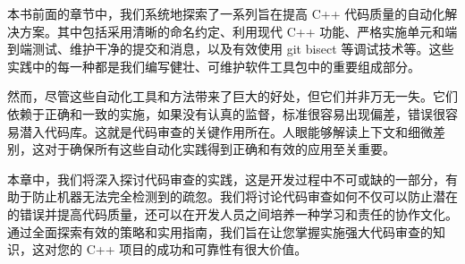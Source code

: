 本书前面的章节中，我们系统地探索了一系列旨在提高 C++ 代码质量的自动化解决方案。其中包括采用清晰的命名约定、利用现代 C++ 功能、严格实施单元和端到端测试、维护干净的提交和消息，以及有效使用 git bisect 等调试技术等。这些实践中的每一种都是我们编写健壮、可维护软件工具包中的重要组成部分。

然而，尽管这些自动化工具和方法带来了巨大的好处，但它们并非万无一失。它们依赖于正确和一致的实施，如果没有认真的监督，标准很容易出现偏差，错误很容易潜入代码库。这就是代码审查的关键作用所在。人眼能够解读上下文和细微差别，这对于确保所有这些自动化实践得到正确和有效的应用至关重要。

本章中，我们将深入探讨代码审查的实践，这是开发过程中不可或缺的一部分，有助于防止机器无法完全检测到的疏忽。我们将讨论代码审查如何不仅可以防止潜在的错误并提高代码质量，还可以在开发人员之间培养一种学习和责任的协作文化。通过全面探索有效的策略和实用指南，我们旨在让您掌握实施强大代码审查的知识，这对您的 C++ 项目的成功和可靠性有很大价值。
